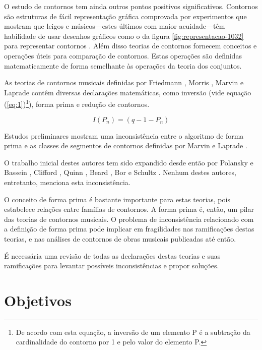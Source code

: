 \documentclass[12pt]{article}
\begin{document}
O estudo de contornos tem ainda outros pontos positivos
significativos. Contornos são estruturas de fácil representação
gráfica comprovada por experimentos que mostram que leigos e
músicos---estes últimos com maior acuidade---têm habilidade de usar
desenhos gráficos como o da figura \ref{fig:representacao-1032} para
representar contornos \cite[p. 69]{marvin88:generalized}. Além disso
teorias de contornos fornecem conceitos e operações úteis para
comparação de contornos. Estas operações são definidas matematicamente
de forma semelhante às operações da teoria dos conjuntos.

As teorias de contornos musicais definidas por Friedmann
\cite{friedmann85:methodology}, Morris
\cite{morris87:composition,morris93:directions}, Marvin e Laprade
\cite{marvin.ea87:relating,marvin88:generalized} contêm diversas
declarações matemáticas, como inversão (vide equação
(\ref{eq:1})\footnote{De acordo com esta equação, a inversão de um
  elemento P é a subtração da cardinalidade do contorno por 1 e pelo
  valor do elemento P.}), forma prima e redução de contornos.

\begin{equation}
  \label{eq:1}
  I(P_n) = (q − 1 − P_n)
\end{equation}

Estudos preliminares mostram uma inconsistência entre o algoritmo de
forma prima e as classes de segmentos de contornos definidas por
Marvin e Laprade \cite{marvin.ea87:relating}.

O trabalho inicial destes autores tem sido expandido desde então por
Polansky e Bassein \cite{polansky.ea92:possible}, Clifford
\cite{clifford95:contour}, Quinn \cite{quinn97:fuzzy}, Beard
\cite{beard03:contour}, Bor \cite{bor09:contour} e Schultz
\cite{schultz08:melodic,schultz09:diachronic}. Nenhum destes autores,
entretanto, menciona esta inconsistência.

O conceito de forma prima é bastante importante para estas teorias,
pois estabelece relações entre famílias de contornos. A forma prima é,
então, um pilar das teorias de contornos musicais. O problema de
inconsistência relacionado com a definição de forma prima pode
implicar em fragilidades nas ramificações destas teorias, e nas
análises de contornos de obras musicais publicadas até então.

É necessária uma revisão de todas as declarações destas teorias e suas
ramificações para levantar possíveis inconsistências e propor soluções.

\section{Objetivos}
\label{sec:objetivos}
\end{document}
